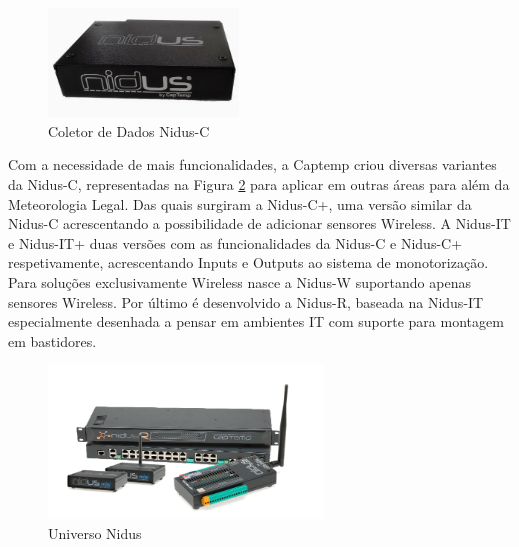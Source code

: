 \begin{figure}[ht]
  \centering
  \includegraphics[width=0.45\textwidth]{images/nidus.jpg}
  \caption{Coletor de Dados Nidus-C}\label{fignidusCl}
\end{figure}

Com a necessidade de mais funcionalidades, a Captemp criou diversas variantes da Nidus-C, representadas na Figura \ref{fignidusall} para aplicar em outras áreas para além da Meteorologia Legal. Das quais surgiram a Nidus-C+, uma versão similar da Nidus-C acrescentando a possibilidade de adicionar sensores Wireless. A Nidus-IT e Nidus-IT+ duas versões com as funcionalidades da Nidus-C e Nidus-C+ respetivamente, acrescentando Inputs e Outputs ao sistema de monotorização. Para soluções exclusivamente Wireless nasce a Nidus-W suportando apenas sensores Wireless. Por último é desenvolvido a Nidus-R, baseada na Nidus-IT especialmente desenhada a pensar em ambientes IT com suporte para montagem em bastidores.
\par
\begin{figure}[ht]
  \centering
  \includegraphics[width=0.65\textwidth]{images/nidusall.png}
  \caption{Universo Nidus}\label{fignidusall}
\end{figure}

